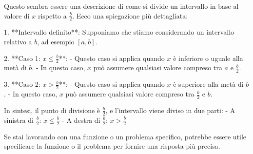 Questo sembra essere una descrizione di come si divide un intervallo in base al valore di \( x \) rispetto a \( \frac{b}{2} \). Ecco una spiegazione più dettagliata:

1. **Intervallo definito**: Supponiamo che stiamo considerando un intervallo relativo a \( b \), ad esempio \( [a, b] \).

2. **Caso 1: \( x \leq \frac{b}{2} \)**:
   - Questo caso si applica quando \( x \) è inferiore o uguale alla metà di \( b \).
   - In questo caso, \( x \) può assumere qualsiasi valore compreso tra \( a \) e \( \frac{b}{2} \).

3. **Caso 2: \( x > \frac{b}{2} \)**:
   - Questo caso si applica quando \( x \) è superiore alla metà di \( b \).
   - In questo caso, \( x \) può assumere qualsiasi valore compreso tra \( \frac{b}{2} \) e \( b \).

In sintesi, il punto di divisione è \( \frac{b}{2} \), e l'intervallo viene diviso in due parti:
- A sinistra di \( \frac{b}{2} \): \( x \leq \frac{b}{2} \)
- A destra di \( \frac{b}{2} \): \( x > \frac{b}{2} \)

Se stai lavorando con una funzione o un problema specifico, potrebbe essere utile specificare la funzione o il problema per fornire una risposta più precisa.